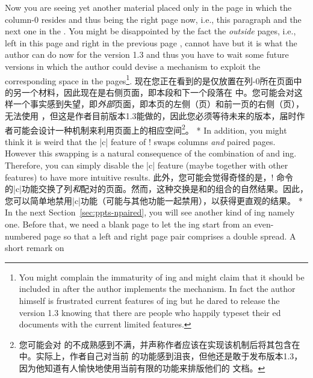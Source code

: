 \begin{paracol}{2}
Now you are seeing yet another material placed only in the page in which
the column-0 resides and thus being the right page now, i.e., this
paragraph and the next one in the \postenv.  You might be disappointed by
the fact the \emph{outside} pages, i.e., left in this page
\pageref{page:ppts-paired2} and right in the previous page
\pageref{sec:ppts-paired}, cannot have \pwstuff{} but it is what the
author can do now for the version 1.3 and thus you have to wait some
future versions in which the author could devise a mechanism to exploit
the corresponding space in the pages\footnote{%
You might complain the immaturity of \parapag{}ing and might claim that it
should be included in \Paracol{} after the author implements the
mechanism.  In fact the author himself is frustrated current features of
\parapag{}ing but he dared to release the version 1.3 knowing that there
are people who happily typeset their \parapag{}ed documents with the
current limited features.}.
\switchcolumn
现在您正在看到的是仅放置在列-0所在页面中的另一个材料，因此现在是右侧页面，即本段和下一个段落在 \postenv 中。您可能会对这样一个事实感到失望，即\emph{外部}页面，即本页的左侧（\pageref{page:ppts-paired2}页）和前一页的右侧（\pageref{sec:ppts-paired}页），无法使用 \pwstuff{}，但这是作者目前版本1.3能做的，因此您必须等待未来的版本，届时作者可能会设计一种机制来利用页面上的相应空间\footnote{%
您可能会对 \parapag{} 的不成熟感到不满，并声称作者应该在实现该机制后将其包含在 \Paracol{} 中。实际上，作者自己对当前 \parapag{} 的功能感到沮丧，但他还是敢于发布版本1.3，因为他知道有人愉快地使用当前有限的功能来排版他们的 \parapag{} 文档。}。
\switchcolumn[0]*
In addition, you might think it is weird that the |c| feature of
\!\twosided! swaps columns \emph{and} paired pages.  However this swapping
is a natural consequence of the combination of \cswap{} and \paired{}
\parapag{}ing.  Therefore, you can simply disable the |c| feature (maybe
together with other features) to have more intuitive results.
\switchcolumn
此外，您可能会觉得奇怪的是，\!\twosided! 命令的|c|功能交换了列\emph{和}配对的页面。然而，这种交换是\cswap{}和\paired{}\parapag{}的组合的自然结果。因此，您可以简单地禁用|c|功能（可能与其他功能一起禁用），以获得更直观的结果。
\switchcolumn[0]*
In the next Section~\ref{sec:ppts-npaired}, you will see another kind of
\parapag{}ing namely \npaired{} one.  Before that, we need a blank page to
let the \npaired{} \parapag{}ing start from an even-numbered page so that
a left and right page pair comprises a double spread.  A short remark on

\end{paracol}
